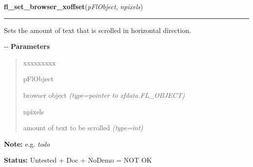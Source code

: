 \hspace{.8\funcindent}\begin{boxedminipage}{\funcwidth}

    \raggedright \textbf{fl\_set\_browser\_xoffset}(\textit{pFlObject}, \textit{npixels})

    \vspace{-1.5ex}

    \rule{\textwidth}{0.5\fboxrule}
\setlength{\parskip}{2ex}

Sets the amount of text that is scrolled in horizontal direction.

-{}-
\setlength{\parskip}{1ex}
      \textbf{Parameters}
      \vspace{-1ex}

      \begin{quote}
        \begin{Ventry}{xxxxxxxxx}

          \item[pFlObject]


browser object
            {\it (type=pointer to xfdata.FL\_OBJECT)}

          \item[npixels]


amount of text to be scrolled
            {\it (type=int)}

        \end{Ventry}

      \end{quote}

\textbf{Note:} 
e.g. \emph{todo}


\textbf{Status:} 
Untested + Doc + NoDemo = NOT OK


    \end{boxedminipage}

    \label{xformslib:flbrowser:fl_set_browser_rel_xoffset}

    \vspace{0.5ex}

